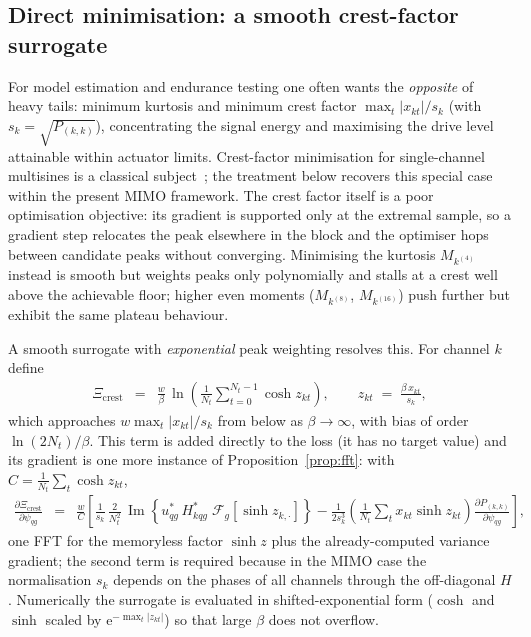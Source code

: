 \documentclass[10pt,a4paper]{article}
\numberwithin{equation}{section}
\newcommand{\abs}[1]{\left|#1\right|}
\newcommand{\block}[1]{\left[#1\right]}
\newcommand{\mat}[1]{\left(#1\right)}
\newcommand{\im}[1]{\operatorname{Im}\left\{#1\right\}}
\newcommand{\m}[1]{\mathrm{#1}}
\begin{document}
\subsection*{Direct minimisation: a smooth crest-factor surrogate}

For model estimation and endurance testing one often wants the \emph{opposite} of heavy tails: minimum kurtosis and minimum crest factor $\max_t\abs{x_{k t}}/s_k$ (with $s_k = \sqrt{P_{(k,k)}}$), concentrating the signal energy and maximising the drive level attainable within actuator limits. Crest-factor minimisation for single-channel multisines is a classical subject~\cite{schroeder1970lowpeak,vanderouderaa1988peak,guillaume1991crest,retzler2022crest}; the treatment below recovers this special case within the present MIMO framework. The crest factor itself is a poor optimisation objective: its gradient is supported only at the extremal sample, so a gradient step relocates the peak elsewhere in the block and the optimiser hops between candidate peaks without converging. Minimising the kurtosis $M_{k^{(4)}}$ instead is smooth but weights peaks only polynomially and stalls at a crest well above the achievable floor; higher even moments ($M_{k^{(8)}}$, $M_{k^{(16)}}$) push further but exhibit the same plateau behaviour.

A smooth surrogate with \emph{exponential} peak weighting resolves this. For channel $k$ define
\begin{eqnarray}
\Xi_{\m{crest}} &=& \frac{w}{\beta}\,\ln\mat{\frac{1}{N_t}\sum_{t=0}^{N_t-1}\cosh z_{k t}},
\qquad z_{k t} \;=\; \frac{\beta\, x_{k t}}{s_k},
\end{eqnarray}
which approaches $w \max_t \abs{x_{k t}}/s_k$ from below as $\beta\to\infty$, with bias of order $\ln\mat{2 N_t}/\beta$. This term is added directly to the loss (it has no target value) and its gradient is one more instance of Proposition~\ref{prop:fft}: with $C = \frac{1}{N_t}\sum_t \cosh z_{k t}$,
\begin{eqnarray}
\frac{\partial \Xi_{\m{crest}}}{\partial \psi_{q g}}
	&=& \frac{w}{C}\block{\frac{1}{s_k}\,\frac{2}{N_t^2}\,\im{u_{q g}^*\, H_{k q g}^*\;\mathcal{F}_g\block{\sinh z_{k,\cdot}}}
	- \frac{1}{2 s_k^3}\mat{\frac{1}{N_t}\sum_t x_{k t}\sinh z_{k t}}\frac{\partial P_{(k,k)}}{\partial \psi_{q g}}},
\end{eqnarray}
one FFT for the memoryless factor $\sinh z$ plus the already-computed variance gradient; the second term is required because in the MIMO case the normalisation $s_k$ depends on the phases of all channels through the off-diagonal $H$. Numerically the surrogate is evaluated in shifted-exponential form ($\cosh$ and $\sinh$ scaled by $\m{e}^{-\max_t\abs{z_{k t}}}$) so that large $\beta$ does not overflow.
\end{document}
